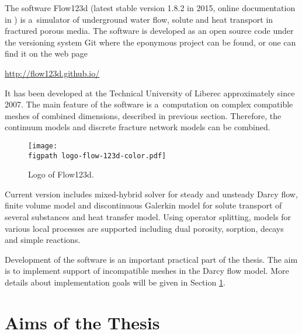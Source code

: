 \documentclass[bibliography=totocnumbered,dvipsnames,FM,Dis]{tulthesis_autoreferat}
\newcommand{\figpath}{figures/}
\begin{document}
The software Flow123d (latest stable version 1.8.2 in 2015, online documentation in \cite{flow123d_doc_2015}) 
is a~simulator of underground water flow, solute and heat transport in fractured porous media. The software is
developed as an open source code under the versioning system Git where the eponymous project can be found, or 
one can find it on the web page
\begin{center}
\url{http://flow123d.github.io/}
\end{center}
It has been developed at the Technical University of Liberec approximately since 2007.
The main feature of the software is a~computation on complex compatible meshes of combined dimensions, described in
previous section. Therefore, the continuum models and discrete fracture network models can be combined.
%
\begin{figure}[!htb]
  \centering
  \texttt{[image: \\figpath logo-flow-123d-color.pdf]}
  \caption{Logo of Flow123d.}
  \label{fig:logo_flow123d}
\end{figure}
%
Current version includes mixed-hybrid solver for steady and unsteady Darcy flow, finite volume model 
and discontinuous Galerkin model for solute transport of several substances and heat transfer model. 
Using operator splitting, models for various local processes are supported including dual porosity, sorption, decays 
and simple reactions.


Development of the software is an important practical part of the thesis. The aim is to implement support 
of incompatible meshes in the Darcy flow model. More details about implementation goals will be given in
Section \ref{chap:aims}.



\section{Aims of the Thesis}\label{chap:aims}
\end{document}
